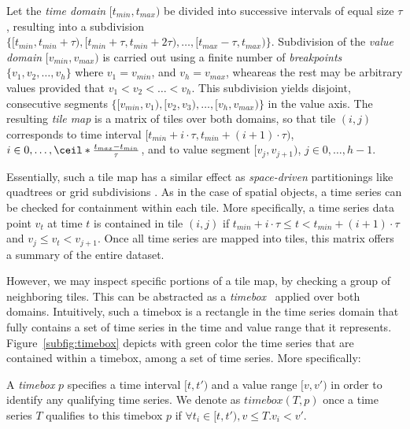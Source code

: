 \begin{mydefinition} 
Let the {\em time domain} $[t_{min}, t_{max})$ be divided into successive intervals of equal size $\tau$, resulting into a subdivision $\{[t_{min}, t_{min}+\tau), [t_{min}+\tau, t_{min}+2\tau), \dots, [t_{max}-\tau, t_{max})\}$. Subdivision of the {\em value domain} $[v_{min}, v_{max})$ is carried out using a finite number of {\em breakpoints} $\{v_1, v_2, \dots, v_h\}$ where $v_1 = v_{min}$, and $v_h = v_{max}$, wheareas the rest may be arbitrary values provided that $v_1 < v_2 < \dots < v_h$. This subdivision yields disjoint, consecutive segments $\{[v_{min}, v_1), [v_2, v_3), \dots, [v_h, v_{max})\}$ in the value axis. The resulting {\em tile map} is a matrix of tiles over both domains, so that tile $(i,j)$ corresponds to time interval $[t_{min}+i\cdot\tau, t_{min}+(i+1)\cdot\tau)$, $i \in {0,\dots,\ceil*{\frac{t_{max}-t_{min}}{\tau}}}$, and to value segment $[v_j, v_{j+1})$, $j \in {0, \dots, h-1}$.
\end{mydefinition}

Essentially, such a tile map has a similar effect as {\em space-driven} partitionings like quadtrees or grid subdivisions \cite{2001:SDA:377296}. As in the case of spatial objects, a time series can be checked for containment within each tile. More specifically, a time series data point $v_t$ at time $t$ is contained in tile $(i, j)$ if $t_{min}+i\cdot\tau \leq t < t_{min}+(i+1)\cdot\tau$ and $v_j \leq v_t < v_{j+1}$. Once all time series are mapped into tiles, this matrix offers a summary of the entire dataset.

However, we may inspect specific portions of a tile map, by checking a group of neighboring tiles. This can be abstracted as a {\em timebox}~\cite{hochheiser2003interactive} applied over both domains. Intuitively, such a timebox is a rectangle in the time series domain that fully contains a set of time series in the time and value range that it represents. Figure~\ref{subfig:timebox} depicts with green color the time series that are contained within a timebox, among a set of time series. More specifically:


\begin{mydefinition} [Timebox]
A {\em timebox} $p$ specifies a time interval $[t,t')$ and a value range $[v,v')$ in order to identify any qualifying time series. We denote as $timebox(T, p)$ once a time series $T$ qualifies to this timebox $p$ if $\forall t_i \in [t,t'), v \leq T.v_i < v'$.  
\end{mydefinition}


